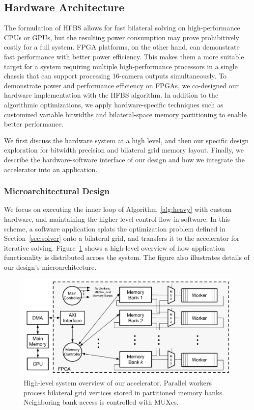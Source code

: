 \subsection{Hardware Architecture}

The formulation of HFBS allows for fast bilateral solving on high\hyp{}performance CPUs or GPUs, but the resulting power consumption may prove prohibitively costly for a full system. 
FPGA platforms, on the other hand, can demonstrate fast performance with better power efficiency. 
This makes them a more suitable target for a system requiring multiple high\hyp{}performance processors in a single chassis that can support processing 16-camera outputs simultaneously.
To demonstrate power and performance efficiency on FPGAs, we co-designed our hardware implementation with the HFBS algorithm.
In addition to the algorithmic optimizations, we apply hardware-specific techniques such as customized variable bitwidths and bilateral-space memory partitioning to enable better performance. 

We first discuss the hardware system at a high level, and then our specific design exploration for bitwidth precision and bilateral grid memory layout. 
Finally, we describe the hardware-software interface of our design and how we integrate the accelerator into an application. 


\subsubsection{Microarchitectural Design}

We focus on executing the inner loop of Algorithm~\ref{alg:heavy} with custom hardware, and maintaining the higher-level control flow in software. 
In this scheme, a software application splats the optimization problem defined in Section~\ref{sec:solver} onto a bilateral grid, and transfers it to the accelerator for iterative solving.
Figure~\ref{fig:sys-overview} shows a high-level overview of how application functionality is distributed across the system.
The figure also illustrates details of our design's microarchitecture. 

\begin{figure}[h]
\centering
\includegraphics[width=.5\columnwidth]{hfbs-figs/system_architecture.pdf}

\caption{High-level system overview of our accelerator. Parallel workers process bilateral grid vertices stored in partitioned memory banks. 
Neighboring bank access is controlled with MUXes.
}
\label{fig:sys-overview}

\end{figure}

